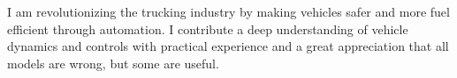 
\begin{cvparagraph}
I am revolutionizing the trucking industry by making vehicles safer and more fuel efficient through automation.
I contribute a deep understanding of vehicle dynamics and controls with practical experience and a great appreciation that all models are wrong, but some are useful.
\end{cvparagraph}
